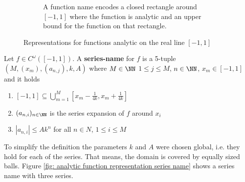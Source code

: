 \begin{figure}
\begin{subfigure}{.45\textwidth}
			\caption{A function name encodes a closed rectangle around $[-1,1]$ where the function is analytic and an upper bound for the function on that rectangle.}\label{fig: analytic function representation function name}
		\end{subfigure}
		\caption{Representations for functions analytic on the real line $[-1,1]$}\label{fig: analytic function representations}
	 \end{figure}
	\begin{definition}\label{def:series_name_rect}
		Let $f \in C^\omega([-1,1])$.
		A \textbf{series-name} for $f$ is a 5-tuple $(M, (x_m), (a_{n, j}), k, A)$ where $M \in \NN$
		$1 \leq j \leq M$, $n \in \NN$, $x_m \in [-1,1]$ and it holds
		\begin{enumerate}
			\item $[-1,1] \subseteq \bigcup_{m=1}^M [x_m - \frac{1}{4k}, x_m + \frac{1}{4k}]$
			\item $(a_{n,i})_{n \in \NN}$ is the series expansion of $f$ around $x_i$
			\item $|a_{n,i}| \leq Ak^n$ for all $n \in N$, $1 \leq i \leq M$
		\end{enumerate}
	\end{definition}
	To simplify the definition the parameters $k$ and $A$ were chosen global, i.e. they hold for each of the series.
	That means, the domain is covered by equally sized balls. 
	Figure \ref{fig: analytic function representation series name} shows a series name with three series.
	
